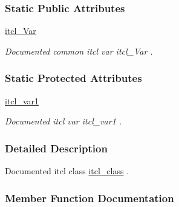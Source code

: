 \subsubsection*{Static Public Attributes}
\begin{DoxyCompactItemize}
\item 
\mbox{\label{classns_1_1itcl__class_a8df46696ce554fed04d170932260fbb8}} 
\hyperlink{classns_1_1itcl__class_a8df46696ce554fed04d170932260fbb8}{itcl\+\_\+\+Var}
\begin{DoxyCompactList}\small\item\em Documented common itcl var {\ttfamily itcl\+\_\+\+Var} . \end{DoxyCompactList}\end{DoxyCompactItemize}
\subsubsection*{Static Protected Attributes}
\begin{DoxyCompactItemize}
\item 
\mbox{\label{classns_1_1itcl__class_ae515e43ca6bb755d116416f94a13d344}} 
\hyperlink{classns_1_1itcl__class_ae515e43ca6bb755d116416f94a13d344}{itcl\+\_\+var1}
\begin{DoxyCompactList}\small\item\em Documented itcl var {\ttfamily itcl\+\_\+var1} . \end{DoxyCompactList}\end{DoxyCompactItemize}


\subsubsection{Detailed Description}
Documented itcl class {\ttfamily \hyperlink{classns_1_1itcl__class}{itcl\+\_\+class}} . 

\subsubsection{Member Function Documentation}
\mbox{\label{classns_1_1itcl__class_abc59160f823f3a6ec8c292c034aedbc3}} 
